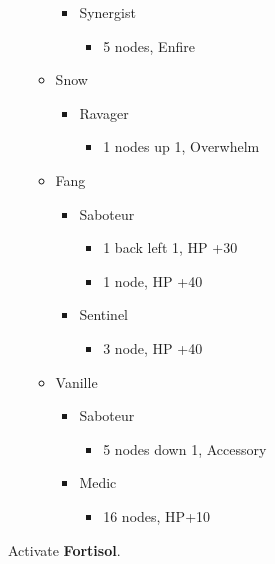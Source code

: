\begin{multicols}{2}
\begin{menu}
\begin{itemize}
\begin{itemize}
\begin{itemize}
                \item Synergist
                      \begin{itemize}
                        \item 5 nodes, Enfire
                      \end{itemize}
              \end{itemize}
        \item Snow
              \begin{itemize}
                \item Ravager
                      \begin{itemize}
                        \item 1 nodes up 1, Overwhelm
                      \end{itemize}
              \end{itemize}
        \item Fang
              \begin{itemize}
                \item Saboteur
                      \begin{itemize}
                        \item 1 back left 1, HP +30
                        \item 1 node, HP +40
                      \end{itemize}
                \item Sentinel
                      \begin{itemize}
                        \item 3 node, HP +40
                      \end{itemize}
              \end{itemize}
        \item Vanille
              \begin{itemize}
                \item Saboteur
                      \begin{itemize}
                        \item 5 nodes down 1, Accessory
                      \end{itemize}
                \item Medic
                      \begin{itemize}
                        \item 16 nodes, HP+10
                      \end{itemize}
              \end{itemize}
      \end{itemize}

    \end{itemize}
  \end{menu}
   Activate \textbf{Fortisol}.

\end{multicols}
